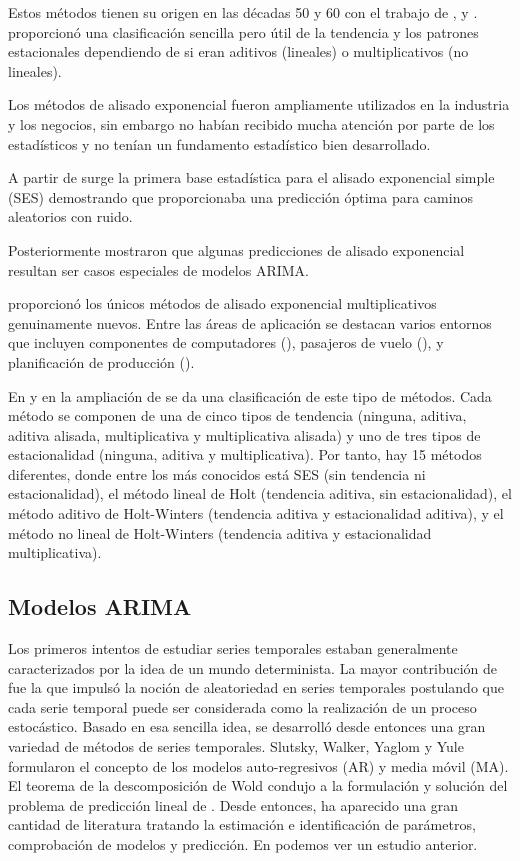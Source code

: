 \documentclass{llncs}
\begin{document}
Estos métodos tienen su origen en las décadas 50 y 60 con el trabajo de \cite{Brown1959}, \cite{Holt20045} y \cite{Winters1960324}. \cite{Pegels1969311} proporcionó una clasificación sencilla pero útil de la tendencia y los patrones estacionales dependiendo de si eran aditivos (lineales)  o multiplicativos (no lineales).

Los métodos de alisado exponencial fueron ampliamente utilizados en la industria y los negocios, sin embargo no habían recibido mucha atención por parte de los estadísticos y no tenían un fundamento estadístico bien desarrollado. 

A partir de \cite{Muth1960299} surge la primera base estadística para el alisado exponencial simple (SES) demostrando que proporcionaba una predicción óptima para caminos aleatorios con ruido. 

Posteriormente \cite{Box1976} mostraron que algunas predicciones de alisado exponencial resultan ser casos especiales de modelos ARIMA.

\cite{Taylor2003715} proporcionó los únicos métodos de alisado exponencial multiplicativos genuinamente nuevos. Entre las áreas de aplicación se destacan varios entornos que incluyen componentes de computadores (\cite{GardnerJr1993245}), pasajeros de vuelo (\cite{Grubb200171}), y planificación de producción (\cite{Miller1993509}).

En \cite{Hyndman2002439} y en la ampliación de \cite{Taylor2003715} se da una clasificación de este tipo de métodos. Cada método se componen de una de cinco tipos de tendencia (ninguna, aditiva, aditiva alisada, multiplicativa y multiplicativa alisada) y uno de tres tipos de estacionalidad (ninguna, aditiva y multiplicativa). Por tanto, hay 15 métodos diferentes, donde entre los más conocidos está SES (sin tendencia ni estacionalidad), el método lineal de Holt (tendencia aditiva, sin estacionalidad), el método aditivo de Holt-Winters (tendencia aditiva y estacionalidad aditiva), y el método no lineal de Holt-Winters (tendencia aditiva y estacionalidad multiplicativa).


\subsection{Modelos ARIMA}

Los primeros intentos de estudiar series temporales estaban generalmente caracterizados por la idea de un mundo determinista. La mayor contribución de \cite{Yule1927267} fue la que impulsó la noción de aleatoriedad en series temporales postulando que cada serie temporal puede ser considerada como la realización de un proceso estocástico. Basado en esa sencilla idea, se desarrolló desde entonces una gran variedad de métodos de series temporales. Slutsky, Walker, Yaglom y Yule formularon el concepto de los modelos auto-regresivos (AR) y media móvil (MA). El teorema de la descomposición de Wold condujo a la formulación y solución del problema de predicción lineal de \cite{Kolmogorov19411}. Desde entonces, ha aparecido una gran cantidad de literatura tratando la estimación e identificación de parámetros, comprobación de modelos y predicción. En \cite{Newbold198323} podemos ver un estudio anterior.
\end{document}
